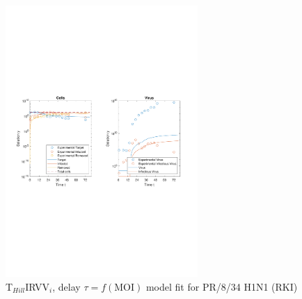 \begin{figure}[H]
\begin{center}
\includegraphics[width=0.65\textwidth, trim={1cm 9.8cm 1cm 9.5cm}, clip]{D_chapters/6_appendix/4_ValidationRKI/InfectionDepletionModelTHillIRVViDelayMOI0.025log.pdf}
\caption[T$_{Hill}$IRVV$_i$, delay $\tau = f(\text{MOI})$ model fit forPR/8/34 H1N1 (RKI)]%
{T$_{Hill}$IRVV$_i$, delay $\tau = f(\text{MOI})$ model fit for PR/8/34 H1N1 (RKI)}
\label{figure:THillIRVViDelayValidationRKI}
\end{center}
\end{figure}

